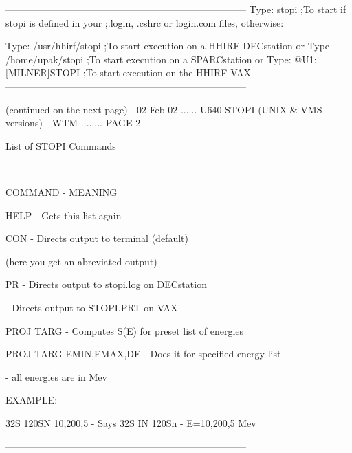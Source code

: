    ---------------------------------------------------------------------------
   Type:  stopi              ;To start if stopi is defined in your
                             ;.login, .cshrc or login.com files, otherwise:
 
   Type:  /usr/hhirf/stopi   ;To start execution on a HHIRF DECstation
   or
   Type   /home/upak/stopi   ;To start execution on a SPARCstation
   or
   Type: @U1:[MILNER]STOPI   ;To start execution on the HHIRF VAX
   ---------------------------------------------------------------------------
 
                          (continued on the next page)
    
   02-Feb-02 ...... U640  STOPI (UNIX & VMS versions) -  WTM ........ PAGE   2
 
 
 
   List of STOPI Commands
 
   ---------------------------------------------------------------------------
 
   COMMAND                - MEANING
 
   HELP                   - Gets this list again
 
   CON                    - Directs output to terminal (default)
 
                            (here you get an abreviated output)
 
   PR                     - Directs output to stopi.log on DECstation
 
                          - Directs output to STOPI.PRT on VAX
 
   PROJ TARG              - Computes S(E) for preset list of energies
 
   PROJ TARG EMIN,EMAX,DE - Does it for specified energy list
 
                          - all energies are in Mev
 
 
   EXAMPLE:
 
 
   32S 120SN 10,200,5     - Says 32S IN 120Sn - E=10,200,5 Mev
 
   ---------------------------------------------------------------------------
 
